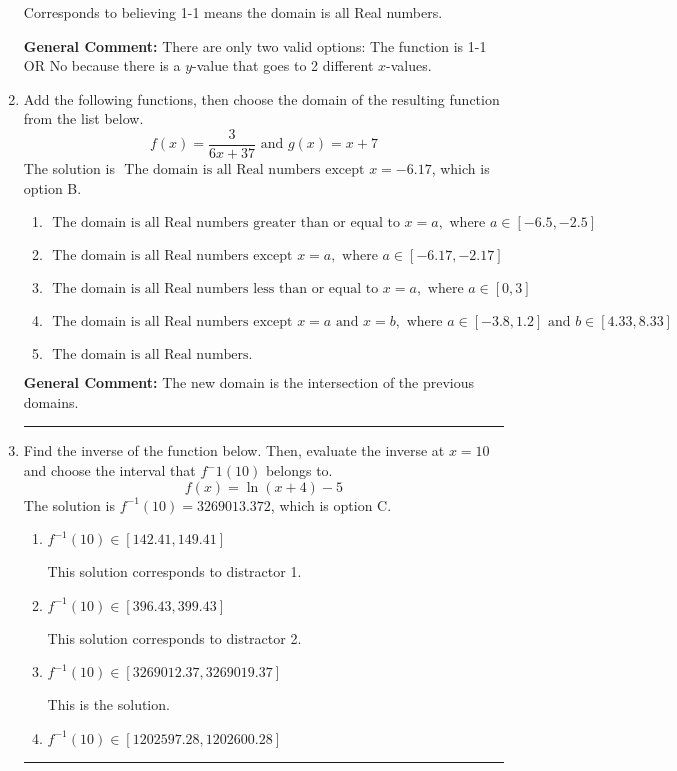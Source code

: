 \documentclass{extbook}[14pt]
\newcommand{\litem}[1]{\item #1

\rule{\textwidth}{0.4pt}}
\begin{document}
\begin{enumerate}
{\begin{enumerate}[label=\Alph*.]
Corresponds to believing 1-1 means the domain is all Real numbers.
\end{enumerate}

\textbf{General Comment:} There are only two valid options: The function is 1-1 OR No because there is a $y$-value that goes to 2 different $x$-values.
}
\litem{
Add the following functions, then choose the domain of the resulting function from the list below.
\[ f(x) = \frac{3}{6x+37} \text{ and } g(x) = x + 7 \]The solution is \( \text{ The domain is all Real numbers except } x = -6.17 \), which is option B.\begin{enumerate}[label=\Alph*.]
\item \( \text{ The domain is all Real numbers greater than or equal to } x = a, \text{ where } a \in [-6.5, -2.5] \)


\item \( \text{ The domain is all Real numbers except } x = a, \text{ where } a \in [-6.17, -2.17] \)


\item \( \text{ The domain is all Real numbers less than or equal to } x = a, \text{ where } a \in [0, 3] \)


\item \( \text{ The domain is all Real numbers except } x = a \text{ and } x = b, \text{ where } a \in [-3.8, 1.2] \text{ and } b \in [4.33, 8.33] \)


\item \( \text{ The domain is all Real numbers. } \)


\end{enumerate}

\textbf{General Comment:} The new domain is the intersection of the previous domains.
}
\litem{
Find the inverse of the function below. Then, evaluate the inverse at $x = 10$ and choose the interval that $f^-1(10)$ belongs to.
\[ f(x) = \ln{(x+4)}-5 \]The solution is \( f^{-1}(10) = 3269013.372 \), which is option C.\begin{enumerate}[label=\Alph*.]
\item \( f^{-1}(10) \in [142.41, 149.41] \)

 This solution corresponds to distractor 1.
\item \( f^{-1}(10) \in [396.43, 399.43] \)

 This solution corresponds to distractor 2.
\item \( f^{-1}(10) \in [3269012.37, 3269019.37] \)

 This is the solution.
\item \( f^{-1}(10) \in [1202597.28, 1202600.28] \)


\end{enumerate}}
\end{enumerate}
\end{document}
